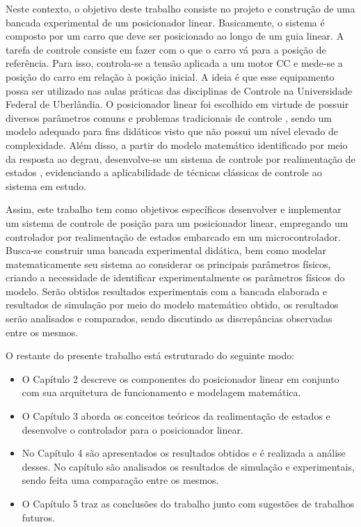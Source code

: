 Neste contexto, o objetivo deste trabalho consiste no projeto e construção de uma bancada experimental de um posicionador linear. Basicamente, o sistema é composto por um carro que deve ser posicionado ao longo de um guia linear. A tarefa de controle consiste em fazer com o que o carro vá para a posição de referência. Para isso, controla-se a tensão aplicada a um motor CC e mede-se a posição do carro em relação à posição inicial. A ideia é que esse equipamento possa ser utilizado nas aulas práticas das disciplinas de Controle na Universidade Federal de Uberlândia. O posicionador linear foi escolhido em virtude de possuir diversos parâmetros comuns e problemas tradicionais de controle \cite{netto2016relatorio}, sendo um modelo adequado para fins didáticos visto que não possui um nível elevado de complexidade. Além disso, a partir do modelo matemático identificado por meio da resposta ao degrau, desenvolve-se um sistema de controle por realimentação de estados \cite{ogata2010engenharia}, evidenciando a aplicabilidade de técnicas clássicas de controle ao sistema em estudo. 

Assim, este trabalho tem como objetivos específicos desenvolver e implementar um sistema de controle de posição para um posicionador linear, empregando um controlador por realimentação de estados embarcado em um microcontrolador. Busca-se construir uma bancada experimental didática, bem como modelar matematicamente seu sistema ao considerar os principais parâmetros físicos, criando a necessidade de identificar experimentalmente os parâmetros físicos do modelo. Serão obtidos resultados experimentais com a bancada elaborada e resultados de simulação por meio do modelo matemático obtido, os resultados serão analisados e comparados, sendo discutindo as discrepâncias observadas entre os mesmos.

O restante do presente trabalho está estruturado do seguinte modo:

\begin{itemize}
    \item O Capítulo 2 descreve os componentes do posicionador linear em conjunto com sua arquitetura de funcionamento e modelagem matemática.
    \item O Capítulo 3 aborda os conceitos teóricos da realimentação de estados e desenvolve o controlador para o posicionador linear.
    \item No Capítulo 4 são apresentados os resultados obtidos e é realizada a análise desses. No capítulo são analisados os resultados de simulação e experimentais, sendo feita uma comparação entre os mesmos.
    \item O Capítulo 5 traz as conclusões do trabalho junto com sugestões de trabalhos futuros.
\end{itemize}